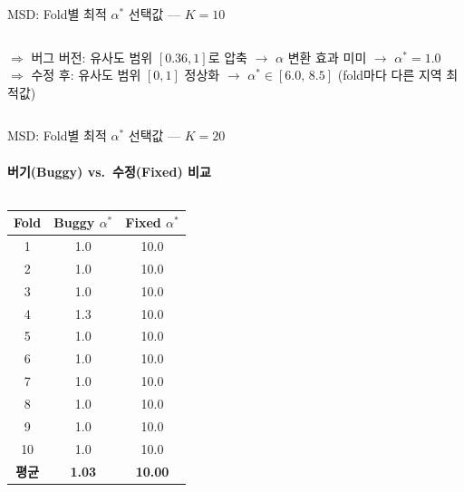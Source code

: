 \documentclass[aspectratio=169,10pt]{beamer}
\begin{document}
\begin{frame}[shrink=10]{MSD: Fold별 최적 $\alpha^*$ 선택값 --- $K=10$}
\begin{columns}[T]
			\vspace{0.3em}
			{\small\color{negred}$\Rightarrow$ 버그 버전: 유사도 범위 $[0.36,1]$로 압축 $\rightarrow$ $\alpha$ 변환 효과 미미 $\rightarrow$ $\alpha^*=1.0$}\\[2pt]
			{\small\color{posblue}$\Rightarrow$ 수정 후: 유사도 범위 $[0,1]$ 정상화 $\rightarrow$ $\alpha^* \in [6.0,\,8.5]$ (fold마다 다른 지역 최적값)}
	\end{columns}
\end{frame}

\begin{frame}[shrink=10]{MSD: Fold별 최적 $\alpha^*$ 선택값 --- $K=20$}
	\framesubtitle{버기(Buggy) vs.\ 수정(Fixed) 비교}

	\begin{columns}[T]
			\centering
			\small
			\begin{tabular}{ccc}
				\toprule
				\textbf{Fold} & \textbf{Buggy $\alpha^*$} & \textbf{Fixed $\alpha^*$} \\
				\midrule
				1  & 1.0 & \cellcolor{posblue!25}10.0 \\
				2  & 1.0 & \cellcolor{posblue!25}10.0 \\
				3  & 1.0 & \cellcolor{posblue!25}10.0 \\
				4  & 1.3 & \cellcolor{posblue!25}10.0 \\
				5  & 1.0 & \cellcolor{posblue!25}10.0 \\
				6  & 1.0 & \cellcolor{posblue!25}10.0 \\
				7  & 1.0 & \cellcolor{posblue!25}10.0 \\
				8  & 1.0 & \cellcolor{posblue!25}10.0 \\
				9  & 1.0 & \cellcolor{posblue!25}10.0 \\
				10 & 1.0 & \cellcolor{posblue!25}10.0 \\
				\midrule
				\textbf{평균} & \textbf{1.03} & \cellcolor{posblue!40}\textbf{10.00} \\
				\bottomrule
			\end{tabular}


\end{columns}
\end{frame}
\end{document}
